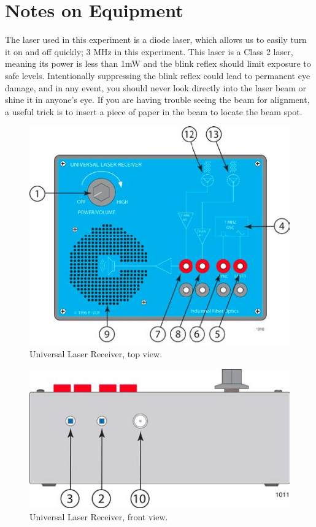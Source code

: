 \documentclass{article}
\begin{document}
\section{Notes on Equipment}

The laser used in this experiment is a diode laser, which allows us to easily turn it on and off quickly; 3 MHz in this experiment.  This laser is a Class 2 laser, meaning its power is less than 1mW and the blink reflex should limit exposure to safe levels.  Intentionally suppressing the blink reflex could lead to permanent eye damage, and in any event, you should never look directly into the laser beam or shine it in anyone's eye.  If you are having trouble seeing the beam for alignment, a useful trick is to insert a piece of paper in the beam to locate the beam spot.

\begin{figure}
\centering
\includegraphics{images/if-lsl-sa1opman-revd.jpg}
\caption{Universal Laser Receiver, top view.}
\label{ULRtop}
\end{figure}

\begin{figure}
\centering
\includegraphics{images/if-lsl-sa1opman-revdfront.jpg}
\caption{Universal Laser Receiver, front view.}
\label{ULRfront}
\end{figure}
\end{document}
